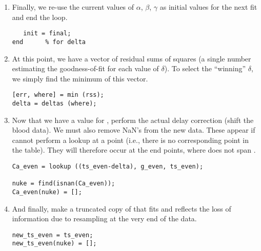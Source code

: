 \begin{enumerate}
\item Finally, we re-use the current values of $\alpha$, $\beta$,
  $\gamma$ as initial values for the next fit and end the  loop.
\begin{verbatim}
   init = final;
end      % for delta
\end{verbatim}

\item At this point, we have a vector of residual sums of squares (a single
  number estimating the goodness-of-fit for each value of $\delta$).
  To select the ``winning'' $\delta$, we simply find the minimum of
  this vector.
\begin{verbatim}
[err, where] = min (rss);
delta = deltas (where);
\end{verbatim}

\item Now that we have a value for , perform the actual
delay correction (shift the blood data).  We must also remove NaN's
from the new data.  These appear if  cannot perform a
lookup at a point (i.e., there is no corresponding point in the table).
They will therefore occur at the end points, where 
does not span .
\begin{verbatim}
Ca_even = lookup ((ts_even-delta), g_even, ts_even);

nuke = find(isnan(Ca_even));
Ca_even(nuke) = [];
\end{verbatim}

\item And finally, make  a truncated copy of
   that fits  and reflects the loss of
  information due to resampling at the very end of the data.
\begin{verbatim}
new_ts_even = ts_even;
new_ts_even(nuke) = [];
\end{verbatim}
\end{enumerate}



